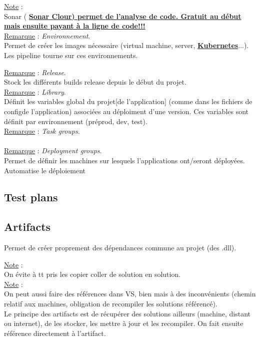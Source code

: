 \documentclass[a4paper,12pt,twoside]{article}
\newcommand{\urlcolor}{magenta}  %
\newcommand{\keycolor}{purple} %
\newcommand{\rem}[2]{\noindent\underline{Remarque} : \textit{#1}.\\ \indent #2}
\newcommand{\note}[1]{\noindent\underline{Note} : \\ \indent #1}
\newcommand{\keyref}[2]{\hypersetup{urlcolor=\keycolor} \href{#1}{\textbf{#2}}\hypersetup{urlcolor=\urlcolor}}
\begin{document}
\note{Sonar (\keyref{https://sonarcloud.io/?gads_campaign=Europe-4-SonarClouds&gads_ad_group=SonarCloud&gads_keyword=sonarcloud&gclid=EAIaIQobChMIsM-P3Zr89AIVe5BoCR05Sg28EAAYASAAEgI_ofD_BwE}{{Sonar Clour}) permet de l'analyse de code. Gratuit au début mais ensuite payant à la ligne de code!!!}\\

\rem{Environnement}{Permet de créer les images nécessaire (virtual machine, server, \keyref{https://fr.wikipedia.org/wiki/Kubernetes}{Kubernetes}...). Les pipeline tourne sur ces environnements.}

\rem{Release}{Stock les différents builds release depuis le début du projet.}\\

\rem{Library}{Définit les variables global du projet[de l'application] (comme dans les fichiers de configde l'application) associées au déploiment d'une version. Ces variables sont définit par environnement (préprod, dev, test).}\\

\rem{Task groups}{}\\

\rem{Deployment groups}{Permet de définir les machines sur lesquels l'applications ont/seront déployées. Automatise le déploiement}\\

\subsection{Test plans}



\subsection{Artifacts}

Permet de créer proprement des dépendances commune au projet (des .dll). 

\note{On évite à tt pris les copier coller de solution en solution.}\\

\note{On peut aussi faire des références dans VS, bien mais à des inconvénients (chemin relatif aux machines, obligation de recompiler les solutions référencé).}\\

Le principe des artifacts est de récupérer des solutions ailleurs (machine, distant ou internet), de les stocker, les mettre à jour et les recompiler. On fait ensuite référence directement à l'artifact.


}
\end{document}
